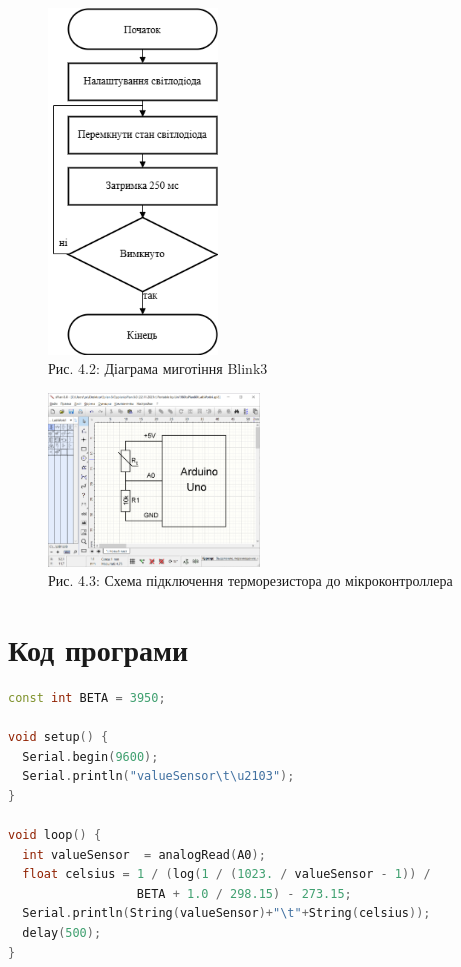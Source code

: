 \documentclass[a4paper]{article}
\begin{document}
\begin{figure}[h]
    \centering
    \includegraphics[width=0.4\textwidth]{imgs/LW4.0.2.png}
    \caption*{Рис. 4.2: Діаграма миготіння Blink3}
\end{figure} 

\newpage 


\begin{figure}[h]
    \centering
    \includegraphics[width=0.5\textwidth]{imgs/LW4.1.png}
    \caption*{Рис. 4.3: Схема підключення терморезистора до мікроконтроллера}
\end{figure} 

\section*{Код програми}
\begin{lstlisting}[language=C++, caption=Програма для вимірювання температури]
const int BETA = 3950;

void setup() {
  Serial.begin(9600);
  Serial.println("valueSensor\t\u2103");
}

void loop() {
  int valueSensor  = analogRead(A0);
  float celsius = 1 / (log(1 / (1023. / valueSensor - 1)) /
                  BETA + 1.0 / 298.15) - 273.15;
  Serial.println(String(valueSensor)+"\t"+String(celsius));
  delay(500);
}
\end{lstlisting}
\end{document}
